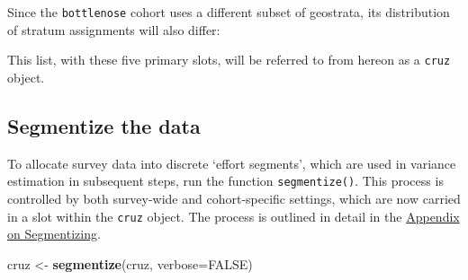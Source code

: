 \documentclass[
]{book}
\newenvironment{Shaded}{\begin{snugshade}}{\end{snugshade}}
\newcommand{\DataTypeTok}[1]{\textcolor[rgb]{0.13,0.29,0.53}{#1}}
\newcommand{\DecValTok}[1]{\textcolor[rgb]{0.00,0.00,0.81}{#1}}
\newcommand{\KeywordTok}[1]{\textcolor[rgb]{0.13,0.29,0.53}{\textbf{#1}}}
\newcommand{\NormalTok}[1]{#1}
\newcommand{\OperatorTok}[1]{\textcolor[rgb]{0.81,0.36,0.00}{\textbf{#1}}}
\newcommand{\OtherTok}[1]{\textcolor[rgb]{0.56,0.35,0.01}{#1}}
\newcommand{\StringTok}[1]{\textcolor[rgb]{0.31,0.60,0.02}{#1}}
\begin{document}
\begin{Shaded}
\end{Shaded}

Since the \texttt{bottlenose} cohort uses a different subset of geostrata, its distribution of stratum assignments will also differ:

\begin{Shaded}
\end{Shaded}

This list, with these five primary slots, will be referred to from hereon as a \texttt{cruz} object.

\hypertarget{segmentize-the-data}{%
\subsection*{Segmentize the data}\label{segmentize-the-data}}

To allocate survey data into discrete `effort segments', which are used in variance estimation in subsequent steps, run the function \texttt{segmentize()}. This process is controlled by both survey-wide and cohort-specific \protect\hypertarget{settings}{}{settings}, which are now carried in a slot within the \texttt{cruz} object. The process is outlined in detail in the \protect\hyperlink{segmentizing}{Appendix on Segmentizing}.

\begin{Shaded}
\begin{Highlighting}[]
\NormalTok{cruz <-}\StringTok{ }\KeywordTok{segmentize}\NormalTok{(cruz, }\DataTypeTok{verbose=}\OtherTok{FALSE}\NormalTok{)}
\end{Highlighting}
\end{Shaded}
\end{document}
